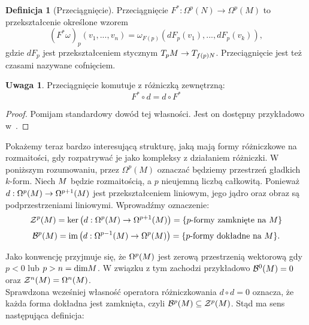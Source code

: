 \documentclass[licencjacka]{pracamgr}
\theoremstyle{definition}
\newtheorem{definition}{Definicja}[section]
\theoremstyle{definition}
\newtheorem{remark}{Uwaga}[section]
\theoremstyle{plain}
\theoremstyle{plain}
\theoremstyle{plain}
\theoremstyle{plain}
\theoremstyle{plain}
\def\M{\ensuremath M}
\begin{document}
\begin{definition}[Przeciągnięcie]
Przeciągnięcie $F^\ast: \Omega^p(N) \rightarrow \Omega^p(M)$ to przekształcenie
określone wzorem
\[
    (F^\ast \omega)_p(v_1, ..., v_n) =
        \omega_{F(p)}(dF_p(v_1), ..., dF_p(v_k)),
\] gdzie $dF_p$ jest przekształceniem stycznym $T_p \M \rightarrow T_{f(p) N}$.
 Przeciągnięcie jest też czasami nazywane cofnięciem.
\end{definition}
\begin{remark}
Przeciągnięcie komutuje z różniczką zewnętrzną:
\[
F^\ast \circ d = d \circ F^\ast
\]
\end{remark}
\begin{proof}
Pomijam standardowy dowód tej własności. Jest on dostępny przykładowo
w~\cite[Lemma 14.16]{lee}.
\end{proof}


Pokażemy teraz bardzo interesującą strukturę, jaką mają formy różniczkowe na
rozmaitości, gdy rozpatrywać je jako kompleksy z działaniem różniczki.  W
poniższym rozumowaniu, przez $\Omega^p (M)$ oznaczać będziemy przestrzeń
gładkich $k$-form.  Niech $\M$ będzie rozmaitością, a $p$ nieujemną
liczbą całkowitą.  Ponieważ $d: \Omega^p (\M ) \rightarrow \Omega^{p+1}(\M) $
jest przekształceniem liniowym, jego jądro oraz obraz są podprzestrzeniami
liniowymi. Wprowadźmy oznaczenie:
\[
\mathcal{Z}^p ( \M ) =
\text{ker} \left( d: \Omega^{p} (\M ) \rightarrow \Omega^{p+1}(\M) \right) =
\{\text{$p$-formy zamknięte na $\M$} \}
\]
\[
\mathcal{B}^p ( \M ) =
\text{im} \left( d: \Omega^{p-1} (\M ) \rightarrow \Omega^{p}(\M) \right) =
\{\text{$p$-formy dokładne na $\M$} \}.
\]

Jako konwencję przyjmuje się, że $\Omega^{p} ( \M ) $ jest zerową
przestrzenią wektorową gdy $p < 0$ lub $p > n = \text{dim} \M $. W
związku z tym zachodzi przykładowo $\mathcal{B}^0(\M)=0$ oraz
$\mathcal{Z}^n(\M)= \Omega^n(\M)$. \\

Sprawdzona wcześniej własność operatora różniczkowania $d \circ d = 0$ oznacza,
że każda forma dokładna jest zamknięta, czyli
$ \mathcal{B}^p ( \M) \subseteq \mathcal{Z}^p ( \M) $.
Stąd ma sens następująca definicja:
\end{document}
